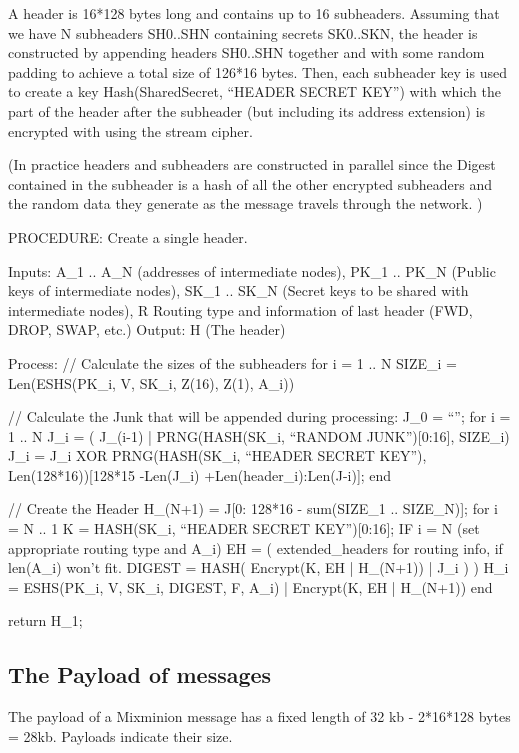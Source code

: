 A header is 16*128 bytes long and contains up to 16
subheaders. Assuming that we have N subheaders SH0..SHN containing
secrets SK0..SKN, the header is constructed by appending headers
SH0..SHN together and with some random padding to achieve a total size
of 126*16 bytes. Then, each subheader key is used to create a key
Hash(SharedSecret, ``HEADER SECRET KEY'') with which the part of the
header after the subheader (but including its address extension) is
encrypted with using the stream cipher. 

(In practice headers and subheaders are constructed in parallel since
the Digest contained in the subheader is a hash of all the other
encrypted subheaders and the random data they generate as the message
travels through the network. )

PROCEDURE: Create a single header.

Inputs: A_1 .. A_N (addresses of intermediate nodes), 
	PK_1 .. PK_N (Public keys of intermediate nodes),
	SK_1 .. SK_N (Secret keys to be shared with intermediate nodes),
        R Routing type and information of last header (FWD, DROP, SWAP, etc.)
Output: H (The header)

Process: 
  // Calculate the sizes of the subheaders
  for i = 1 .. N
	SIZE_i = Len(ESHS(PK_i, V, SK_i, Z(16), Z(1), A_i))

  // Calculate the Junk that will be appended during processing:
  J_0 = ``'';
  for i = 1 .. N
	J_i = ( J_(i-1) | PRNG(HASH(SK_i, ``RANDOM JUNK'')[0:16], SIZE_i)
	J_i = J_i XOR PRNG(HASH(SK_i, ``HEADER SECRET KEY''),
  		Len(128*16))[128*15 -Len(J_i) +Len(header_i):Len(J-i)];
  end

  // Create the Header
  H_(N+1) = J[0: 128*16 - sum(SIZE_1 .. SIZE_N)];
  for i = N .. 1
	K = HASH(SK_i, ``HEADER SECRET KEY'')[0:16];
	IF i = N (set appropriate routing type and A_i)
	EH = ( extended_headers for routing info, if len(A_i) won't fit.
  	DIGEST = HASH( Encrypt(K, EH | H_(N+1)) | J_i ) )
	H_i = ESHS(PK_i, V, SK_i, DIGEST, F, A_i) | Encrypt(K, EH | H_(N+1))
  end

return H_1;

\subsection{The Payload of messages}

The payload of a Mixminion message has a fixed length of 32 kb
- 2*16*128 bytes = 28kb.   Payloads indicate their size.

